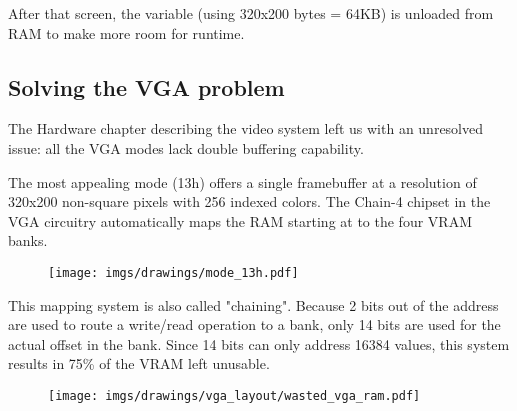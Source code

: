 \documentclass[book.tex]{subfiles}
\begin{document}
\par
\begin{minipage}{\textwidth}

\end{minipage}
After that screen, the  variable (using 320x200 bytes = 64KB) is unloaded from RAM to make more room for runtime.\\
\par




















\subsection{Solving the VGA problem}
The Hardware chapter describing the video system left us with an unresolved issue: all the VGA modes lack double buffering capability.\\
\par
 The most appealing mode (13h) offers a single framebuffer at a resolution of 320x200 non-square pixels with 256 indexed colors. The Chain-4 chipset in the VGA circuitry automatically maps the RAM starting at  to the four VRAM banks. 
 \par
 \begin{figure}[H]
\centering
      \texttt{[image: imgs/drawings/mode\_13h.pdf]}
\end{figure}

This mapping system is also called "chaining". Because 2 bits out of the address are used to route a write/read operation to a bank, only 14 bits are used for the actual offset in the bank. Since 14 bits can only address 16384 values, this system results in 75\% of the VRAM left unusable.\\

\begin{figure}[H]
\centering
 \texttt{[image: imgs/drawings/vga\_layout/wasted\_vga\_ram.pdf]}
 \end{figure}
\end{document}

